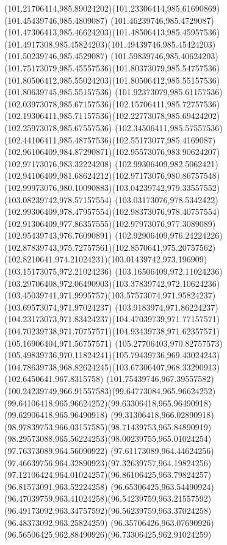 {{\curveto(101.21706414,985.89024202)(101.23306414,985.61690869)(101.45439746,985.4809087)
\curveto(101.46239746,985.4729087)(101.47306413,985.46624203)(101.48506413,985.45957536)
\curveto(101.4917308,985.45824203)(101.49439746,985.45424203)(101.50239746,985.4529087)
\curveto(101.59839746,985.40624203)(101.75173079,985.45557536)(101.80373079,985.54757536)
\curveto(101.80506412,985.55024203)(101.80506412,985.55157536)(101.80639745,985.55157536)
\curveto(101.92373079,985.61157536)(102.03973078,985.67157536)(102.15706411,985.72757536)
\curveto(102.19306411,985.71157536)(102.22773078,985.69424202)(102.25973078,985.67557536)
\curveto(102.34506411,985.57557536)(102.44106411,985.48757536)(102.55173077,985.4169087)
\curveto(102.96106409,984.87290871)(102.95573076,983.90624207)(102.97173076,983.32224208)
\curveto(102.99306409,982.5062421)(102.94106409,981.68624212)(102.97173076,980.86757548)
\curveto(102.99973076,980.10090883)(103.04239742,979.33557552)(103.08239742,978.57157554)
\curveto(103.03173076,978.5342422)(102.99306409,978.47957554)(102.98373076,978.40757554)
\curveto(102.91306409,977.86357555)(102.97973076,977.3089089)(102.95439743,976.76090891)
\curveto(102.92906409,976.24224226)(102.87839743,975.72757561)(102.8570641,975.20757562)
\curveto(102.8210641,974.21024231)(103.01439742,973.196909)(103.15173075,972.21024236)
\curveto(103.16506409,972.11024236)(103.29706408,972.06490903)(103.37839742,972.10624236)
\curveto(103.45039741,971.9995757)(103.57573074,971.95824237)(103.69573074,971.97024237)
\curveto(103.9183974,971.86224237)(104.23173073,971.83424237)(104.47039739,971.77157571)
\curveto(104.70239738,971.70757571)(104.93439738,971.62357571)(105.16906404,971.56757571)
\curveto(105.27706403,970.82757573)(105.49839736,970.11824241)(105.79439736,969.43024243)
\curveto(104.78639738,968.82624245)(103.67306407,968.33290913)(102.6450641,967.8315758)
\curveto(101.75439746,967.39557582)(100.24239749,966.91557583)(99.64773084,965.96624252)
\curveto(99.64106418,965.96624252)(99.63306418,965.96490918)(99.62906418,965.96490918)
\curveto(99.31306418,966.02890918)(98.97839753,966.03157585)(98.71439753,965.84890919)
\curveto(98.29573088,965.56224253)(98.00239755,965.01024254)(97.76373089,964.56090922)
\curveto(97.61173089,964.44624256)(97.46639756,964.32890923)(97.32639757,964.19824256)
\curveto(97.12106424,964.01024257)(96.86106425,963.79824257)(96.81573091,963.52224258)
\curveto(96.65306425,963.54490924)(96.47039759,963.41024258)(96.54239759,963.21557592)
\curveto(96.49173092,963.34757592)(96.56239759,963.37024258)(96.48373092,963.25824259)
\curveto(96.35706426,963.07690926)(96.56506425,962.88490926)(96.73306425,962.91024259)
}}

